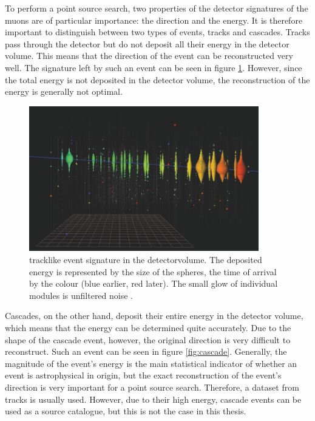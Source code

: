 To perform a point source search, two properties of the detector signatures of the muons are of particular importance: the direction and the energy.
It is therefore important to distinguish between two types of events, tracks and cascades.
Tracks pass through the detector but do not deposit all their energy in the detector volume.
This means that the direction of the event can be reconstructed very well.
The signature left by such an event can be seen in figure \ref{fig:track}.
However, since the total energy is not deposited in the detector volume, the reconstruction of the energy is generally not optimal.
\begin{figure}
    \centering
    \includegraphics[width=10cm]{Plots/01_7_icecube/track.png}
    \caption{tracklike event signature in the detectorvolume. The deposited energy is represented by the size of the spheres, the time of arrival by the colour (blue earlier, red later). The small glow of individual modules is unfiltered noise \cite{spiering}.}
    \label{fig:track}
\end{figure}
Cascades, on the other hand, deposit their entire energy in the detector volume, which means that the energy can be determined quite accurately.
Due to the shape of the cascade event, however, the original direction is very difficult to reconstruct.
Such an event can be seen in figure \ref{fig:cascade}.
Generally, the magnitude of the event's energy is the main statistical indicator of whether an event is astrophysical in origin, but the exact reconstruction of the event's direction is very important for a point source search.
Therefore, a dataset from tracks is usually used.
However, due to their high energy, cascade events can be used as a source catalogue, but this is not the case in this thesis.
